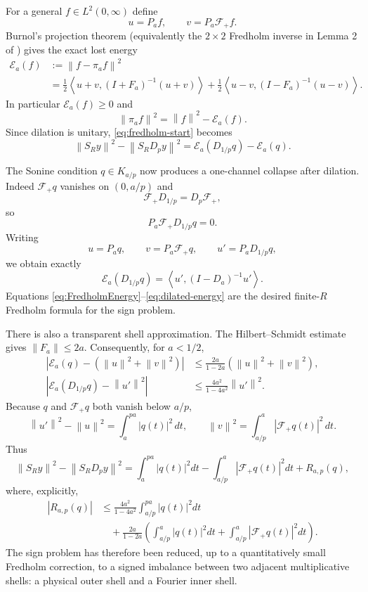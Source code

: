 \documentclass[11pt]{article}
\theoremstyle{remark}
\newcommand{\norm}[1]{\left\lVert #1\right\rVert}
\newcommand{\ip}[2]{\left\langle #1,#2\right\rangle}
\begin{document}
For a general $f\in L^2(0,\infty)$ define
\[
 u=P_af,\qquad v=P_a\mathcal F_+f.
\]
Burnol's projection theorem (equivalently the $2\times2$ Fredholm inverse in Lemma 2 of \cite{Burnol2002Sonine}) gives the exact lost energy
\begin{align}
 \mathcal E_a(f)&:=\norm{f-\pi_af}^2\\
 &=\frac12\ip{u+v}{(I+F_a)^{-1}(u+v)}
 +\frac12\ip{u-v}{(I-F_a)^{-1}(u-v)}.\label{eq:FredholmEnergy}
\end{align}
In particular $\mathcal E_a(f)\ge0$ and
\[
 \norm{\pi_af}^2=\norm f^2-\mathcal E_a(f).
\]
Since dilation is unitary, \eqref{eq:fredholm-start} becomes
\begin{equation}\label{eq:fredholm-difference}
 \norm{S_Ry}^2-\norm{S_RD_py}^2
 =\mathcal E_a(D_{1/p}q)-\mathcal E_a(q).
\end{equation}

The Sonine condition $q\in K_{a/p}$ now produces a one-channel collapse after dilation. Indeed $\mathcal F_+q$ vanishes on $(0,a/p)$ and
\[
 \mathcal F_+D_{1/p}=D_p\mathcal F_+,
\]
so
\[
 P_a\mathcal F_+D_{1/p}q=0.
\]
Writing
\[
 u=P_aq,\qquad v=P_a\mathcal F_+q,
 \qquad u'=P_aD_{1/p}q,
\]
we obtain exactly
\begin{equation}\label{eq:dilated-energy}
 \mathcal E_a(D_{1/p}q)=\ip{u'}{(I-D_a)^{-1}u'}.
\end{equation}
Equations \eqref{eq:FredholmEnergy}--\eqref{eq:dilated-energy} are the desired finite-$R$ Fredholm formula for the sign problem.

There is also a transparent shell approximation. The Hilbert--Schmidt estimate gives $\norm{F_a}\le2a$. Consequently, for $a<1/2$,
\begin{align}
 \left|\mathcal E_a(q)-(\norm u^2+\norm v^2)\right|
 &\le \frac{2a}{1-2a}(\norm u^2+\norm v^2),\label{eq:Eapprox1}\\
 \left|\mathcal E_a(D_{1/p}q)-\norm{u'}^2\right|
 &\le \frac{4a^2}{1-4a^2}\norm{u'}^2.\label{eq:Eapprox2}
\end{align}
Because $q$ and $\mathcal F_+q$ both vanish below $a/p$,
\[
 \norm{u'}^2-\norm u^2
 =\int_a^{pa}|q(t)|^2\,dt,
 \qquad
 \norm v^2=\int_{a/p}^{a}|\mathcal F_+q(t)|^2\,dt.
\]
Thus
\begin{equation}\label{eq:shell-balance}
 \boxed{
 \norm{S_Ry}^2-\norm{S_RD_py}^2
 =\int_a^{pa}|q(t)|^2dt
 -\int_{a/p}^{a}|\mathcal F_+q(t)|^2dt
 +R_{a,p}(q),}
\end{equation}
where, explicitly,
\begin{align*}
 |R_{a,p}(q)|
 &\le \frac{4a^2}{1-4a^2}\int_{a/p}^{pa}|q(t)|^2dt\\
 &\quad+\frac{2a}{1-2a}
 \left(\int_{a/p}^{a}|q(t)|^2dt+
 \int_{a/p}^{a}|\mathcal F_+q(t)|^2dt\right).
\end{align*}
The sign problem has therefore been reduced, up to a quantitatively small Fredholm correction, to a signed imbalance between two adjacent multiplicative shells: a physical outer shell and a Fourier inner shell.
\end{document}
